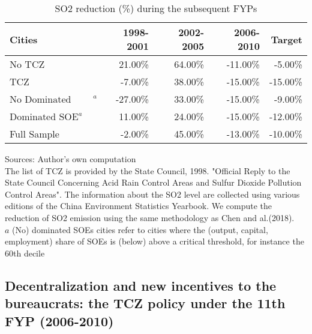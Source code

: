 \documentclass[12pt]{article}
\begin{document}
\begin{table}[!htb] \centering
\caption{\\ SO2 reduction (\%) during the subsequent FYPs}
\label{table_1}
\begin{adjustbox}{width=\textwidth, totalheight=\baselineskip,keepaspectratio}
\begin{tabular}{lrrrr}
\toprule
             Cities &  1998-2001 &  2002-2005 &  2006-2010 &  Target \\
\midrule
             No TCZ &     21.00\% &     64.00\% &    -11.00\% &  -5.00\% \\
                TCZ &     -7.00\% &     38.00\% &    -15.00\% & -15.00\% \\
  $\text{No Dominated SOE}^ a$ &    -27.00\% &     33.00\% &    -15.00\% &  -9.00\% \\
     $\text{Dominated SOE}^ a$ &     11.00\% &     24.00\% &    -15.00\% & -12.00\% \\
        Full Sample &     -2.00\% &     45.00\% &    -13.00\% & -10.00\% \\    
        
        
\bottomrule
\end{tabular}
\end{adjustbox}
\begin{tablenotes} 
 \small 
 \item 
Sources: Author's own computation \\
The list of TCZ is provided by the State Council, 1998.
"Official Reply to the State Council Concerning Acid Rain Control Areas
and Sulfur Dioxide Pollution Control Areas".
The information about the SO2 level are collected using various editions
of the China Environment Statistics Yearbook.
We compute the reduction of SO2 emission using the same methodology
as Chen and al.(2018). \\
$a$ (No) dominated SOEs cities refer to cities where the 
(output, capital, employment) share of SOEs is (below) above a critical threshold, for instance the 60th decile
 
\end{tablenotes}
\end{table}

\subsection{Decentralization and new incentives to the bureaucrats: the TCZ policy under the 11th FYP (2006-2010)}
\end{document}
